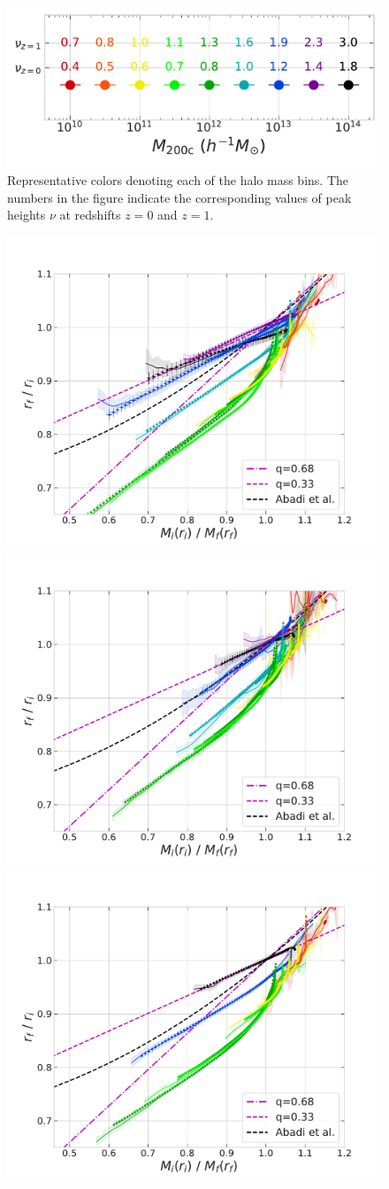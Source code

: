 \begin{figure}[htbp]
\centering
\includegraphics[width=0.49\linewidth]{plots/Mass_bin_labels_z.pdf}
\caption{Representative colors denoting each of the halo mass bins. The numbers in the figure indicate the corresponding values of peak heights $\nu$ at redshifts $z=0$ and $z=1$.}
\label{fig:mass_bin_label-z01}
\end{figure}

\begin{figure}
\centering
\includegraphics[width=0.48\linewidth]{plots/fit_view_M_T_snap049.pdf}
\includegraphics[width=0.48\linewidth]{plots/fit_view_M_T_snap049_smpl98.pdf}
\includegraphics[width=0.48\linewidth]{plots/fit_view_M_T_snap049_smpl98_allHalsMrange.pdf}

\end{figure}
